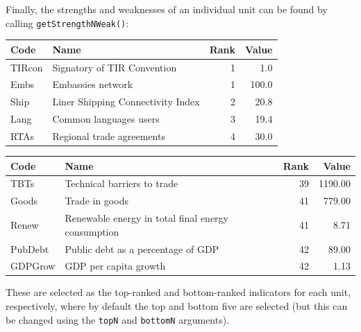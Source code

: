 \documentclass[
]{book}
\newenvironment{Shaded}{\begin{snugshade}}{\end{snugshade}}
\newcommand{\DataTypeTok}[1]{\textcolor[rgb]{0.13,0.29,0.53}{#1}}
\newcommand{\KeywordTok}[1]{\textcolor[rgb]{0.13,0.29,0.53}{\textbf{#1}}}
\newcommand{\NormalTok}[1]{#1}
\newcommand{\OperatorTok}[1]{\textcolor[rgb]{0.81,0.36,0.00}{\textbf{#1}}}
\newcommand{\StringTok}[1]{\textcolor[rgb]{0.31,0.60,0.02}{#1}}
\begin{document}
Finally, the strengths and weaknesses of an individual unit can be found by calling \texttt{getStrengthNWeak()}:

\begin{Shaded}
\end{Shaded}

\begin{tabular}{l|l|r|r}
\hline
Code & Name & Rank & Value\\
\hline
TIRcon & Signatory of TIR Convention & 1 & 1.0\\
\hline
Embs & Embassies network & 1 & 100.0\\
\hline
Ship & Liner Shipping Connectivity Index & 2 & 20.8\\
\hline
Lang & Common languages users & 3 & 19.4\\
\hline
RTAs & Regional trade agreements & 4 & 30.0\\
\hline
\end{tabular}

\begin{Shaded}
\end{Shaded}

\begin{tabular}{l|l|r|r}
\hline
Code & Name & Rank & Value\\
\hline
TBTs & Technical barriers to trade & 39 & 1190.00\\
\hline
Goods & Trade in goods & 41 & 779.00\\
\hline
Renew & Renewable energy in total final energy consumption & 41 & 8.71\\
\hline
PubDebt & Public debt as a percentage of GDP & 42 & 89.00\\
\hline
GDPGrow & GDP per capita growth & 42 & 1.13\\
\hline
\end{tabular}

These are selected as the top-ranked and bottom-ranked indicators for each unit, respectively, where by default the top and bottom five are selected (but this can be changed using the \texttt{topN} and \texttt{bottomN} arguments).
\end{document}
